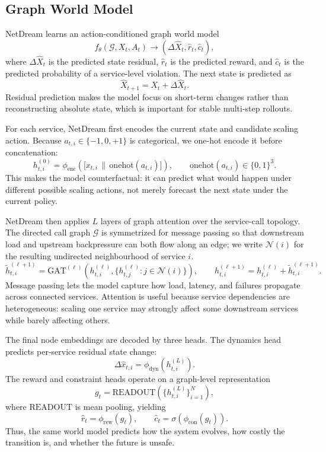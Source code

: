 \subsection{Graph World Model}
\label{sec:world-model}

NetDream learns an action-conditioned graph world model
\[
f_\theta(\mathcal{G},X_t,A_t)
\rightarrow
(\Delta\hat{X}_t,\hat{r}_t,\hat{c}_t),
\]
where $\Delta\hat{X}_t$ is the predicted state residual, $\hat{r}_t$ is
the predicted reward, and $\hat{c}_t$ is the predicted probability of a
service-level violation. The next state is predicted as
\[
\hat{X}_{t+1}=X_t+\Delta\hat{X}_t .
\]
Residual prediction makes the model focus on short-term changes rather
than reconstructing absolute state, which is important for stable
multi-step rollouts.

For each service, NetDream first encodes the current state and candidate
scaling action. Because $a_{t,i}\in\{-1,0,+1\}$ is categorical, we
one-hot encode it before concatenation:
\[
h^{(0)}_{t,i}
=
\phi_{\mathrm{enc}}\left(\bigl[x_{t,i}\,\bigl\|\,
\mathrm{onehot}(a_{t,i})\bigr]\right),
\qquad
\mathrm{onehot}(a_{t,i})\in\{0,1\}^{3}.
\]
This makes the model counterfactual: it can predict what would happen
under different possible scaling actions, not merely forecast the next
state under the current policy.

NetDream then applies $L$ layers of graph attention over the service-call
topology. The directed call graph $\mathcal{G}$ is symmetrized for
message passing so that downstream load and upstream backpressure can
both flow along an edge; we write $\mathcal{N}(i)$ for the resulting
undirected neighbourhood of service $i$.
\[
\tilde{h}^{(\ell+1)}_{t,i}
=
\mathrm{GAT}^{(\ell)}
\left(
h^{(\ell)}_{t,i},
\{h^{(\ell)}_{t,j}:j\in\mathcal{N}(i)\}
\right),
\qquad
h^{(\ell+1)}_{t,i}
=
h^{(\ell)}_{t,i}+\tilde{h}^{(\ell+1)}_{t,i}.
\]
Message passing lets the model capture how load, latency, and failures
propagate across connected services. Attention is useful because service
dependencies are heterogeneous: scaling one service may strongly affect
some downstream services while barely affecting others.

The final node embeddings are decoded by three heads. The dynamics head
predicts per-service residual state change:
\[
\Delta\hat{x}_{t,i}=\phi_{\mathrm{dyn}}(h^{(L)}_{t,i}).
\]
The reward and constraint heads operate on a graph-level representation
\[
g_t=\mathrm{READOUT}\left(\{h^{(L)}_{t,i}\}_{i=1}^{N}\right),
\]
where $\mathrm{READOUT}$ is mean pooling, yielding
\[
\hat{r}_t=\phi_{\mathrm{rew}}(g_t),
\qquad
\hat{c}_t=\sigma(\phi_{\mathrm{con}}(g_t)).
\]
Thus, the same world model predicts how the system evolves, how costly
the transition is, and whether the future is unsafe.

